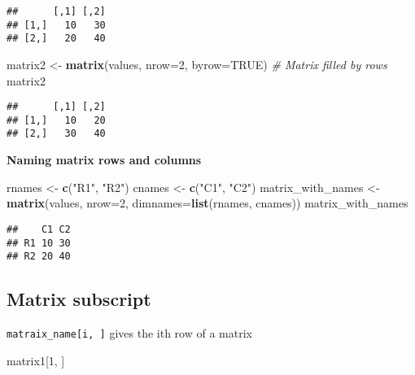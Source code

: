 \documentclass[]{book}
\newenvironment{Shaded}{\begin{snugshade}}{\end{snugshade}}
\newcommand{\CommentTok}[1]{\textcolor[rgb]{0.56,0.35,0.01}{\textit{#1}}}
\newcommand{\DataTypeTok}[1]{\textcolor[rgb]{0.13,0.29,0.53}{#1}}
\newcommand{\DecValTok}[1]{\textcolor[rgb]{0.00,0.00,0.81}{#1}}
\newcommand{\KeywordTok}[1]{\textcolor[rgb]{0.13,0.29,0.53}{\textbf{#1}}}
\newcommand{\NormalTok}[1]{#1}
\newcommand{\OtherTok}[1]{\textcolor[rgb]{0.56,0.35,0.01}{#1}}
\newcommand{\StringTok}[1]{\textcolor[rgb]{0.31,0.60,0.02}{#1}}
\begin{document}
\begin{verbatim}
##      [,1] [,2]
## [1,]   10   30
## [2,]   20   40
\end{verbatim}

\begin{Shaded}
\begin{Highlighting}[]
\NormalTok{matrix2 <-}\StringTok{ }\KeywordTok{matrix}\NormalTok{(values, }\DataTypeTok{nrow=}\DecValTok{2}\NormalTok{, }\DataTypeTok{byrow=}\OtherTok{TRUE}\NormalTok{) }\CommentTok{# Matrix filled by rows}
\NormalTok{matrix2}
\end{Highlighting}
\end{Shaded}

\begin{verbatim}
##      [,1] [,2]
## [1,]   10   20
## [2,]   30   40
\end{verbatim}

\textbf{Naming matrix rows and columns}

\begin{Shaded}
\begin{Highlighting}[]
\NormalTok{rnames <-}\StringTok{ }\KeywordTok{c}\NormalTok{(}\StringTok{"R1"}\NormalTok{, }\StringTok{"R2"}\NormalTok{)}
\NormalTok{cnames <-}\StringTok{ }\KeywordTok{c}\NormalTok{(}\StringTok{"C1"}\NormalTok{, }\StringTok{"C2"}\NormalTok{)}
\NormalTok{matrix_with_names <-}\StringTok{ }\KeywordTok{matrix}\NormalTok{(values, }\DataTypeTok{nrow=}\DecValTok{2}\NormalTok{, }\DataTypeTok{dimnames=}\KeywordTok{list}\NormalTok{(rnames, cnames))}
\NormalTok{matrix_with_names}
\end{Highlighting}
\end{Shaded}

\begin{verbatim}
##    C1 C2
## R1 10 30
## R2 20 40
\end{verbatim}

\hypertarget{matrix-subscript}{%
\subsection{Matrix subscript}\label{matrix-subscript}}

\texttt{matraix\_name{[}i,\ {]}} gives the ith row of a matrix

\begin{Shaded}
\begin{Highlighting}[]
\NormalTok{matrix1[}\DecValTok{1}\NormalTok{, ]}
\end{Highlighting}
\end{Shaded}
\end{document}
